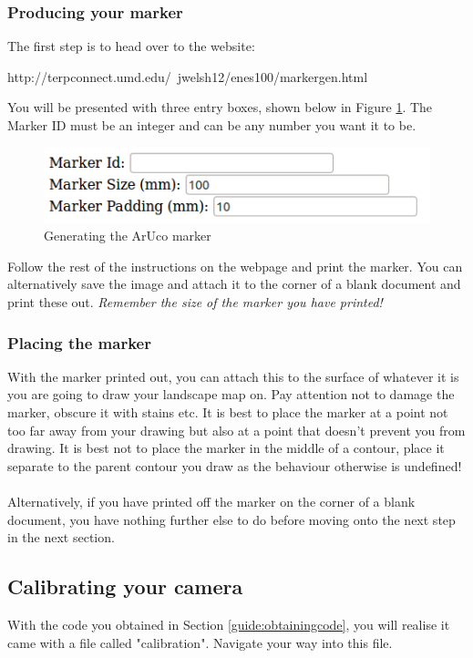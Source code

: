 \documentclass[11pt]{article}
\begin{document}
\subsubsection*{Producing your marker}
The first step is to head over to the website:

\begin{center}
http://terpconnect.umd.edu/~jwelsh12/enes100/markergen.html
\end{center}

You will be presented with three entry boxes, shown below in
Figure \ref{guide:markergeneration}. The Marker ID must be an integer
and can be any number you want it to be. 

\begin{figure}[!h]
	\centering
	\includegraphics[scale=0.8]{userguide/markersite.png}
	\caption{Generating the ArUco marker}
	\label{guide:markergeneration}
\end{figure}

Follow the rest of the instructions on the webpage and print the marker.
You can alternatively save the image and attach it to the corner of a
blank document and print these out. \textit{Remember the size of the marker
you have printed!}

\subsubsection*{Placing the marker}
With the marker printed out, you can attach this to the surface of 
whatever it is you are going to draw your landscape map on. Pay
attention not to damage the marker, obscure it with stains etc. It
is best to place the marker at a point not too far away from your
drawing but also at a point that doesn't prevent you from drawing.
It is best not to place the marker in the middle of a contour,
place it separate to the parent contour you draw as the behaviour
otherwise is undefined!\\
\\
Alternatively, if you have printed off the marker on the corner of 
a blank document, you have nothing further else to do before moving onto 
the next step in the next section.

\subsection{Calibrating your camera}
With the code you obtained in Section \ref{guide:obtainingcode}, you
will realise it came with a file called "calibration". Navigate your way 
into this file.
\end{document}

